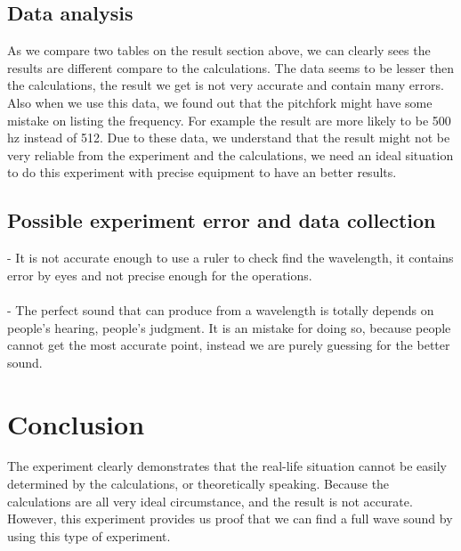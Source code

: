 \documentclass{article}
\begin{document}
\subsection{Data analysis}
As we compare two tables on the result section above, we can clearly sees the results are different compare to the calculations. The data seems to be lesser then the calculations, the result we get is not very accurate and contain many errors. Also when we use this data, we found out that the pitchfork might have some mistake on listing the frequency. For example the result are more likely to be 500 hz instead of 512. Due to these data, we understand that the result might not be very reliable from the experiment and the calculations, we need an ideal situation to do this experiment with precise equipment to have an better results. 
\subsection{Possible experiment error and data collection}
- It is not accurate enough to use a ruler to check find the wavelength, it contains error by eyes and not precise enough for the operations. \\ \\
- The perfect sound that can produce from a wavelength is totally depends on people's hearing, people's judgment. It is an mistake for doing so, because people cannot get the most accurate point, instead we are purely guessing for the better sound.
\section{Conclusion}
The experiment clearly demonstrates that the real-life situation cannot be easily determined by the calculations, or theoretically speaking. Because the calculations are all very ideal circumstance, and the result is not accurate. However, this experiment provides us proof that we can find a full wave sound by using this type of experiment. 

\end{document}
